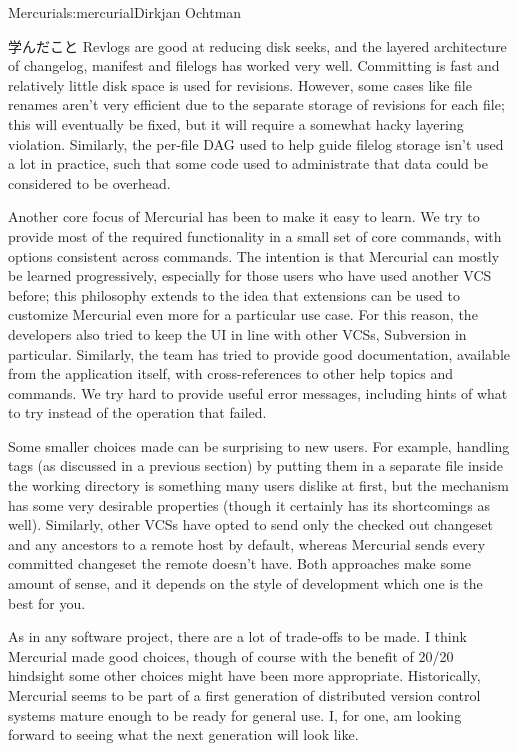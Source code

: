 \begin{aosachapter}{Mercurial}{s:mercurial}{Dirkjan Ochtman}
\begin{aosasect1}{学んだこと}
Revlogs are good at reducing disk seeks, and the layered architecture
of changelog, manifest and filelogs has worked very well. Committing
is fast and relatively little disk space is used for revisions.
However, some cases like file renames aren't very efficient due to
the separate storage of revisions for each file; this will eventually
be fixed, but it will require a somewhat hacky layering violation.
Similarly, the per-file DAG used to help guide filelog storage isn't
used a lot in practice, such that some code used to administrate
that data could be considered to be overhead.

Another core focus of Mercurial has been to make it easy to learn.  We
try to provide most of the required functionality in a small set of
core commands, with options consistent across commands. The intention
is that Mercurial can mostly be learned progressively, especially for
those users who have used another VCS before; this philosophy extends
to the idea that extensions can be used to customize Mercurial even
more for a particular use case. For this reason, the developers also
tried to keep the UI in line with other VCSs, Subversion in
particular.  Similarly, the team has tried to provide good
documentation, available from the application itself, with
cross-references to other help topics and commands. We try hard to
provide useful error messages, including hints of what to try instead
of the operation that failed.

Some smaller choices made can be surprising to new users. For example,
handling tags (as discussed in a previous section) by putting them in
a separate file inside the working directory is something many users
dislike at first, but the mechanism has some very desirable properties
(though it certainly has its shortcomings as well). Similarly, other
VCSs have opted to send only the checked out changeset and any
ancestors to a remote host by default, whereas Mercurial sends every
committed changeset the remote doesn't have. Both approaches make some
amount of sense, and it depends on the style of development which one
is the best for you.

As in any software project, there are a lot of trade-offs to be made.
I think Mercurial made good choices, though of course with the benefit
of 20/20 hindsight some other choices might have been more appropriate.
Historically, Mercurial seems to be part of a first generation of
distributed version control systems mature enough to be ready for
general use. I, for one, am looking forward to seeing what the next
generation will look like.

\end{aosasect1}

\end{aosachapter}
